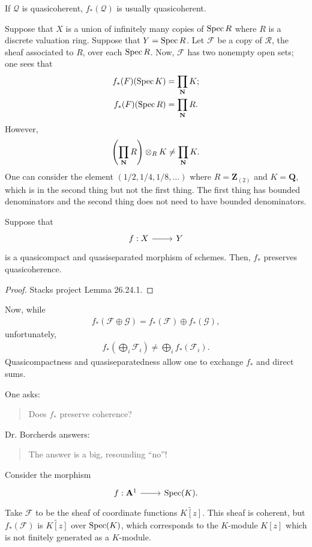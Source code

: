 \documentclass [11 pt, oneside] {article}
\begin{document}
If $\mathscr{Q}$ is quasicoherent, $f_*(\mathscr{Q})$ is usually quasicoherent.
\begin{example}\label{}\text{}
Suppose that $X$ is a union of infinitely many copies of $\operatorname{Spec} R$ where $R$ is a discrete valuation ring. Suppose that $Y=\operatorname{Spec} R$. Let $\mathscr{F}$ be a copy of $\mathscr{R}$, the sheaf associated to $R$, over each $\operatorname{Spec} R$. Now, $\mathscr{F}$ has two nonempty open sets; one sees that
\begin{align*}
	f_*(\relax{F})(\operatorname{Spec} K) &= \prod_{ \mathbf{N}} K;\\
	f_*(\relax{F}) (\operatorname{Spec} R) &= \prod_{ \mathbf{N}} R.
\end{align*}
However,
\begin{align*}
	\left( \prod_{\mathbf{N}} R \right) \otimes_R K \ne \prod_{\mathbf{N}}K.
\end{align*}
One can consider the element $(1/2,1/4,1/8,\hdots)$ where $R=\mathbf{Z}_{(2)}$ and $K=\mathbf{Q}$, which is in the second thing but not the first thing. The first thing has bounded denominators and the second thing does not need to have bounded denominators.
\end{example}

\begin{theorem}[ ]\label{}\index{}\text{}
Suppose that 
\[
\begin{tikzcd}
f:X\ar[r]&Y
\end{tikzcd}
\]
is a quasicompact and quasiseparated morphism of schemes. Then, $f_*$ preserves quasicoherence.
\end{theorem}

\begin{proof}
Stacks project Lemma 26.24.1.
\end{proof}

Now, while
\begin{align*}
	f_*(\mathscr{F}\oplus \mathscr{G}) = f_*(\mathscr{F}) \oplus  f_*(\mathscr{G}),
\end{align*}
unfortunately,
\begin{align*}
	f_* \left( \bigoplus_{i}\mathscr{F}_i \right)\ne \bigoplus_{i}f_*(\mathscr{F}_i). 
\end{align*}
Quasicompactness and quasiseparatedness allow one to exchange $f_*$ and direct sums.

One asks:
\begin{quote}
	\small Does $f_*$ preserve coherence?
\end{quote}
Dr. Borcherds answers:
\begin{quote}
	\small The answer is a big, resounding ``no''!
\end{quote}
Consider the morphism 
\[
\begin{tikzcd}
f:\mathbf{A}^1\ar[r]& \Spec (K).
\end{tikzcd}
\]
 Take $\mathscr{F} $ to be the sheaf of coordinate functions $\widetilde{K[z]}$. This sheaf is coherent, but $f_*(\mathscr{F})$ is $\widetilde{K[z]}$ over $\operatorname{Spec} (K)$, which corresponds to the $K$-module $K[z]$ which is not finitely generated as a $K$-module. 
\end{document}
